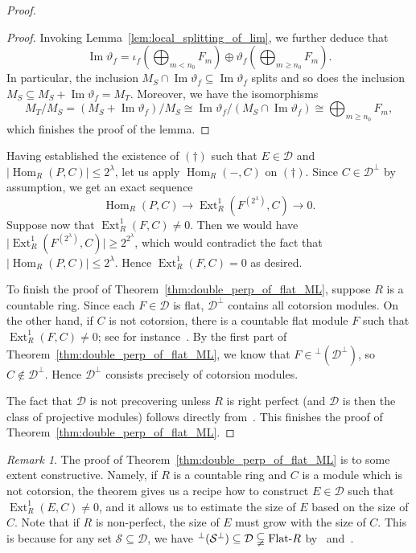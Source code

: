 \documentclass[a4paper,11pt]{amsart}
\newcommand{\st}{such that }
\newcommand{\la}{\longrightarrow}
\DeclareMathOperator{\Hom}{Hom}
\DeclareMathOperator{\Ext}{Ext}
\DeclareMathOperator{\Img}{Im}
\newcommand{\Flat}[1]{\hbox{\rm Flat-}{#1}}
\newcommand{\D}{\mathcal{D}}
\newcommand{\clS}{\mathcal{S}}
\newcommand{\card}[1]{\left\lvert{#1}\right\rvert}
\theoremstyle{plain}
\theoremstyle{definition}
\theoremstyle{remark}
\newtheorem{rem}[thm]{Remark}
\begin{document}
\begin{proof}
\begin{proof}
Invoking Lemma~\ref{lem:local_splitting_of_lim}, we further deduce that
%
$$ \Img \vartheta_f = \iota_f\left(\bigoplus_{m<n_0} F_m\right) \oplus \vartheta_f\left(\bigoplus_{m\ge n_0} F_m\right). $$
%
In particular, the inclusion $M_S \cap \Img \vartheta_f \subseteq \Img \vartheta_f$ splits and so does the inclusion $M_S \subseteq M_S + \Img \vartheta_f = M_T$. Moreover, we have the isomorphisms
%
$$
M_T/M_S = (M_S + \Img \vartheta_f)/M_S \cong \Img \vartheta_f/(M_S \cap \Img \vartheta_f) \cong \bigoplus_{m\ge n_0} F_m,
$$
%
which finishes the proof of the lemma.
\end{proof}

Having established the existence of $(\dag)$ \st $E \in \D$ and $\card{\Hom_R(P,C)} \le 2^\lambda$, let us apply $\Hom_R(-,C)$ on $(\dag)$. Since $C \in \D^\perp$ by assumption, we get an exact sequence
%
$$
\Hom_R(P,C) \la \Ext^1_R(F^{(2^\lambda)},C) \la 0.
$$
%
Suppose now that $\Ext^1_R(F,C) \ne 0$. Then we would have $\lvert \Ext^1_R(F^{(2^\lambda)},C) \rvert \ge 2^{2^\lambda}$, which would contradict the fact that $\card{\Hom_R(P,C)} \le 2^\lambda$. Hence $\Ext^1_R(F,C) = 0$ as desired.

To finish the proof of Theorem~\ref{thm:double_perp_of_flat_ML}, suppose $R$ is a countable ring. Since each $F \in \D$ is flat, $\D^\perp$ contains all cotorsion modules. On the other hand, if $C$ is not cotorsion, there is a countable flat module $F$ \st $\Ext^1_R(F,C) \ne 0$; see for instance~\cite[Theorems 4.1.1 and 3.2.9]{GT}. By the first part of Theorem~\ref{thm:double_perp_of_flat_ML}, we know that $F \in {^\perp (\D^\perp)}$, so $C \not\in \D^\perp$. Hence $\D^\perp$ consists precisely of cotorsion modules.

The fact that $\D$ is not precovering unless $R$ is right perfect (and $\D$ is then the class of projective modules) follows directly from~\cite[Theorem 2.10]{SarT}. This finishes the proof of Theorem~\ref{thm:double_perp_of_flat_ML}.
\end{proof}

\begin{rem} \label{rem:constructive}
The proof of Theorem~\ref{thm:double_perp_of_flat_ML} is to some extent constructive. Namely, if $R$ is a countable ring and $C$ is a module which is not cotorsion, the theorem gives us a recipe how to construct $E \in \D$ \st $\Ext^1_R(E,C) \ne 0$, and it allows us to estimate the size of $E$ based on the size of $C$. Note that if $R$ is non-perfect, the size of $E$ must grow with the size of $C$. This is because for any set $\clS \subseteq \D$, we have ${^\perp (\clS^\perp)} \subseteq \D \subsetneqq \Flat{R}$ by~\cite[Proposition 1.9]{AH} and~\cite[Corollary 3.2.3]{GT}.
\end{rem}
\end{document}

